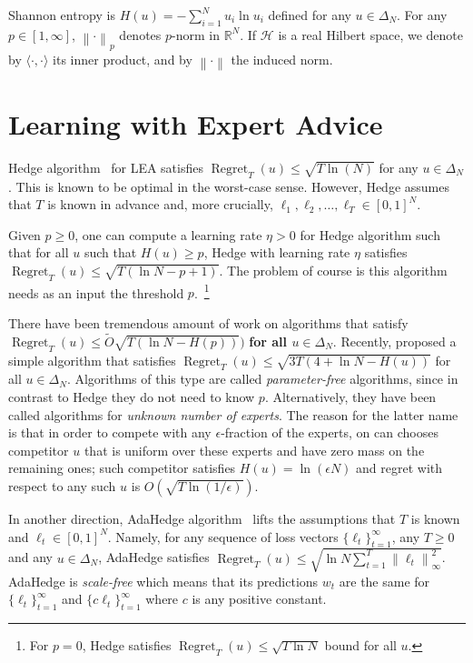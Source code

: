 \documentclass{colt2016} %
\DeclareMathOperator{\Regret}{Regret}
\newcommand{\R}{\mathbb{R}}     %
\renewcommand{\H}{\mathcal{H}}  %
\newcommand{\norm}[1]{\left\|{#1}\right\|}
\begin{document}
Shannon entropy is $H(u) = -\sum_{i=1}^N u_i \ln u_i$ defined for any $u \in
\Delta_N$. For any $p \in [1,\infty]$, $\norm{\cdot}_p$ denotes $p$-norm in
$\R^N$. If $\H$ is a real Hilbert space, we denote by $\langle \cdot, \cdot
\rangle$ its inner product, and by $\norm{\cdot}$ the induced norm.

\section{Learning with Expert Advice}

Hedge algorithm~\citep{Freund-Schapire-1997} for LEA satisfies $\Regret_T(u)
\le \sqrt{T \ln(N)}$ for any $u \in \Delta_N$. This is known to be optimal in
the worst-case sense. However, Hedge assumes that $T$ is known in advance and,
more crucially, $\ell_1, \ell_2, \dots, \ell_T \in [0,1]^N$.

Given $p \ge 0$, one can compute a learning rate $\eta > 0$ for
Hedge algorithm such that for all $u$ such that $H(u) \ge p$, Hedge with
learning rate $\eta$ satisfies $\Regret_T(u) \le \sqrt{T (\ln N - p + 1)}$. The
problem of course is this algorithm needs as an input the threshold
$p$.~\footnote{For $p = 0$, Hedge satisfies  $\Regret_T(u) \le \sqrt{T \ln N}$
bound for all $u$.}

There have been tremendous amount of work \citep{Chaudhuri-Freund-Hsu-2009,
Chernov-Vovk-2010, Koolen-van-Erven-2015, Luo-Schapire-2015} on algorithms that
satisfy $\Regret_T(u) \le \widetilde O\sqrt{T (\ln N - H(p))})$ \textbf{for all
$u \in \Delta_N$}. Recently, \cite{Orabona-Pal-2016-parameter-free} proposed a
simple algorithm that satisfies $\Regret_T(u) \le \sqrt{3 T(4 + \ln N -
H(u))}$ for all $u \in \Delta_N$. Algorithms of this type are called
\emph{parameter-free} algorithms, since in contrast to Hedge they do not need
to know $p$. Alternatively, they have been called algorithms
for \emph{unknown number of experts}. The reason for the latter name is that in
order to compete with any $\epsilon$-fraction of the experts, on can chooses
competitor $u$ that is uniform over these experts and have zero mass on the
remaining ones; such competitor satisfies $H(u) = \ln (\epsilon N)$ and regret
with respect to any such $u$ is $O(\sqrt{T \ln(1/\epsilon)})$.

In another direction, AdaHedge
algorithm~\citep{de-Rooij-van-Erven-Grunwald-Koolen-2014} lifts the assumptions
that $T$ is known and $\ell_t \in [0,1]^N$. Namely, for any sequence of loss
vectors $\{\ell_t\}_{t=1}^\infty$, any $T \ge 0$ and any $u \in \Delta_N$,
AdaHedge satisfies $\Regret_T(u) \le \sqrt{\ln N \sum_{t=1}^T
\norm{\ell_t}_\infty^2}$. AdaHedge is \emph{scale-free} which means that its
predictions $w_t$ are the same for $\{\ell_t\}_{t=1}^\infty$ and $\{c
\ell_t\}_{t=1}^\infty$ where $c$ is any positive constant.
\end{document}
